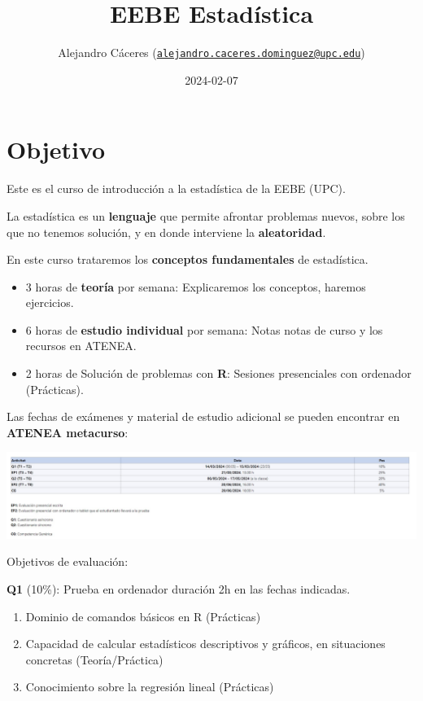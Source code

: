 \documentclass[
]{book}
\title{EEBE Estadística}
\author{Alejandro Cáceres (\href{mailto:alejandro.caceres.dominguez@upc.edu}{\nolinkurl{alejandro.caceres.dominguez@upc.edu}})}
\date{2024-02-07}
\providecommand{\tightlist}{%
  \setlength{\itemsep}{0pt}\setlength{\parskip}{0pt}}
\begin{document}
\maketitle

{
\setcounter{tocdepth}{1}
\tableofcontents
}
\hypertarget{objetivo}{%
\chapter{Objetivo}\label{objetivo}}

Este es el curso de introducción a la estadística de la EEBE (UPC).

La estadística es un \textbf{lenguaje} que permite afrontar problemas nuevos, sobre los que no tenemos solución, y en donde interviene la \textbf{aleatoridad}.

En este curso trataremos los \textbf{conceptos fundamentales} de estadística.

\begin{itemize}
\item
  3 horas de \textbf{teoría} por semana: Explicaremos los conceptos, haremos ejercicios.
\item
  6 horas de \textbf{estudio individual} por semana: Notas notas de curso y los recursos en ATENEA.
\item
  2 horas de Solución de problemas con \textbf{R}: Sesiones presenciales con ordenador (Prácticas).
\end{itemize}

Las fechas de exámenes y material de estudio adicional se pueden encontrar en \textbf{ATENEA metacurso}:

\includegraphics{./figures/notas.JPG}

Objetivos de evaluación:

\textbf{Q1} (10\%): Prueba en ordenador duración 2h en las fechas indicadas.

\begin{enumerate}
\def\labelenumi{\alph{enumi}.}
\tightlist
\item
  Dominio de comandos básicos en R (Prácticas)
\item
  Capacidad de calcular estadísticos descriptivos y gráficos, en situaciones concretas (Teoría/Práctica)
\item
  Conocimiento sobre la regresión lineal (Prácticas)
\end{enumerate}
\end{document}
